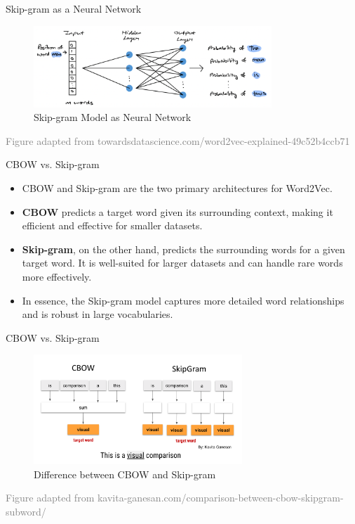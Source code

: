 \documentclass[serif, aspectratio=169]{beamer}
\begin{document}
\begin{frame}{Skip-gram as a Neural Network}
	\begin{figure}
		\centering
		\includegraphics[width=0.8\textwidth]{pic/skip_nn.png}
		\caption*{Skip-gram Model as Neural Network}
	\end{figure}
	\vspace{1.0cm}
	\hspace{-1.0cm}
	{\tiny \textcolor{gray}{Figure adapted from towardsdatascience.com/word2vec-explained-49c52b4ccb71}}
\end{frame}




\begin{frame}{CBOW vs. Skip-gram}
	\begin{itemize}
		\item CBOW and Skip-gram are the two primary architectures for Word2Vec.
		\item \textbf{CBOW} predicts a target word given its surrounding context, making it efficient and effective for smaller datasets.
		\item \textbf{Skip-gram}, on the other hand, predicts the surrounding words for a given target word. It is well-suited for larger datasets and can handle rare words more effectively.
		\item In essence, the Skip-gram model captures more detailed word relationships and is robust in large vocabularies.
	\end{itemize}
\end{frame}


\begin{frame}{CBOW vs. Skip-gram}
	\begin{figure}
		\centering
		\includegraphics[width=0.7\textwidth]{pic/skip_vs_cbow1.png}
		\caption*{Difference between CBOW and Skip-gram}
	\end{figure}
	\vspace{0.4cm}
	\hspace{-1.0cm}
	{\tiny \textcolor{gray}{Figure adapted from kavita-ganesan.com/comparison-between-cbow-skipgram-subword/}}
\end{frame}
\end{document}
